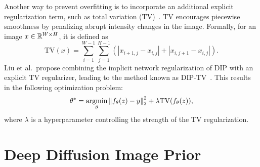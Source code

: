 Another way to prevent overfitting is to incorporate an additional explicit regularization term, such as total variation (TV)~\cite{TV}.
TV encourages piecewise smoothness by penalizing abrupt intensity changes in the image.
Formally, for an image $x \in \mathbb{R}^{W \times H}$, it is defined as
\begin{equation}
    \text{TV}(x) = \sum_{i=1}^{W-1} \sum_{j=1}^{H-1} (|x_{i+1,j} - x_{i,j}| + |x_{i,j+1} - x_{i,j}|).
\end{equation}
Liu et al.\ propose combining the implicit network regularization of DIP with an explicit TV regularizer, leading to the method known as DIP-TV~\cite{DIP-TV}. This results in the following optimization problem:
\begin{equation}
    \theta^* = \operatorname*{argmin}_\theta \left\lVert f_\theta(z) - y\right\rVert_2^2 + \lambda \text{TV}(f_\theta(z)),
\end{equation}
where $\lambda$ is a hyperparameter controlling the strength of the TV regularization.

\section{Deep Diffusion Image Prior}



